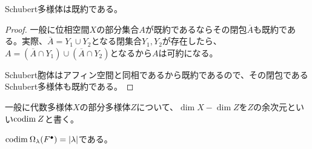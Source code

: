 \documentclass{ltjsreport}
\begin{document}
\begin{cor}
  Schubert多様体は既約である。
\end{cor}

\begin{proof}
  一般に位相空間$X$の部分集合$A$が既約であるならその閉包$\overline{A}$も既約である。実際、$\overline{A}=Y_1\cup Y_2$となる閉集合$Y_1,Y_2$が存在したら、$A=(\overline{A}\cap Y_1)\cup(\overline{A}\cap Y_2)$となるから$A$は可約になる。

  Schubert胞体はアフィン空間と同相であるから既約であるので、その閉包であるSchubert多様体も既約である。
\end{proof}


一般に代数多様体$X$の部分多様体$Z$について、$\dim X-\dim Z$を$Z$の余次元といい$\text{codim}\: Z$と書く。

\begin{fact}
  $\text{codim}\:\Omega_{\lambda}(F^\bullet)=|\lambda|$である。
\end{fact}
\end{document}
